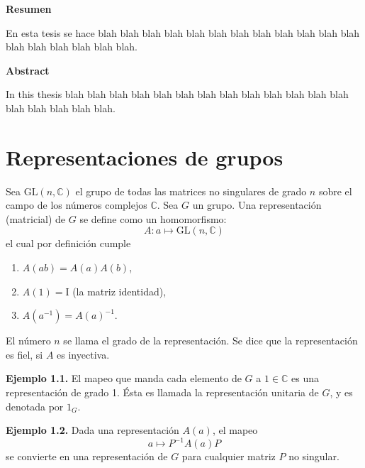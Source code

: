 \documentclass[12pt]{book}
\theoremstyle{definition}
\newcounter{in}
\newcounter{ini}
\begin{document}
\thispagestyle{empty}
\begin{flushleft}
  {\bfseries\Large Resumen}
\end{flushleft}

En esta tesis se hace blah blah blah blah blah blah blah blah blah
blah blah blah blah blah blah blah blah blah.

\vspace{2cm}

\begin{flushleft}
  {\bfseries\Large Abstract}
\end{flushleft}

In this thesis blah blah blah blah blah blah blah blah blah
blah blah blah blah blah blah blah blah blah.

 \newpage \thispagestyle{empty}

\chapter{Representaciones de grupos}
\label{cha:Representaciones de grupos}

Sea $ \mathrm{GL}(n,\mathbb{C})$ el grupo de todas las matrices no
singulares de grado $n$ sobre el campo de los números complejos
$\mathbb{C}$. Sea $G$ un grupo. Una representación (matricial) de $G$
se define como un homomorfismo:
\begin{equation*}
  A \colon a \mapsto \mathrm{GL}(n,\mathbb{C})
\end{equation*}
el cual por definición cumple
\begin{enumerate}
\item $A\left(ab\right)=A\left(a\right)A\left(b\right)$,
\item $A\left(1\right)=\mathrm{I}$ (la matriz identidad),
\item $A\left(a^{-1}\right)=A\left(a\right)^{-1}$.
\end{enumerate}
El número $n$ se llama el grado de la representación. Se dice que la
representación es fiel, si $A$ es inyectiva.

\textbf{Ejemplo 1.1.} El mapeo que manda cada elemento de $G$ a $1
\in \mathbb{C}$ es una representación de grado 1. Ésta es llamada la
representación unitaria de $G$, y es denotada por $1_{G}$.

\textbf{Ejemplo 1.2.} Dada una representación $A\left(a\right)$, el mapeo
\begin{equation*}
  a \mapsto P^{-1}A\left(a\right)P
\end{equation*}  
se convierte en una representación de $G$ para cualquier matriz $P$ no singular.
\end{document}
